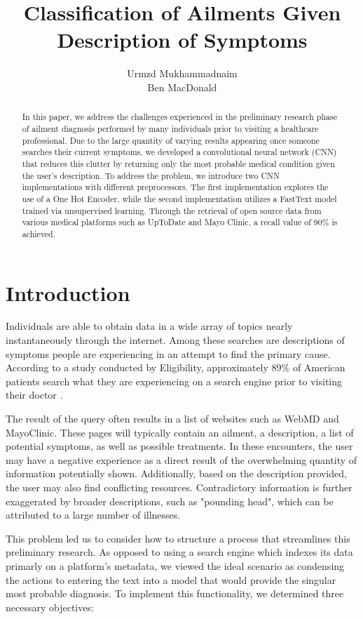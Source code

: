 \documentclass[12pt]{report}
\title{Classification of Ailments Given Description of Symptoms}
\author{Urmzd Mukhammadnaim \\ Ben MacDonald}
\begin{document}
\maketitle
\tableofcontents
\begin{abstract}
	In this paper, we address the challenges experienced in the preliminary research phase
	of ailment diagnosis performed by many individuals prior to visiting a
	healthcare professional. Due to the large quantity of varying results appearing
	once someone searches their current symptoms, we developed a convolutional
	neural network (CNN) that reduces this clutter by returning only the most
	probable medical condition given the user's description.
	To address the problem, we introduce two CNN implementations with different
	preprocessors. The first implementation explores the use of a One Hot Encoder,
	while the second implementation utilizes a FastText model trained via
	unsupervised learning. Through the retrieval of open source data from various medical platforms such
	as UpToDate and Mayo Clinic, a recall value of 90\% is achieved.
\end{abstract}

\chapter{Introduction}
Individuals are able to obtain data in a wide array of topics nearly
instantaneously through the internet. Among these searches are descriptions of
symptoms people are experiencing in an attempt to find the primary cause.
According to a study conducted by Eligibility, approximately 89\% of American
patients search what they are experiencing on a search engine prior to visiting
their doctor \cite{guarino_2019}.

The result of the query often results in a list of websites such as WebMD and
MayoClinic. These pages will typically contain an ailment, a description,
a list of potential symptoms, as well as possible treatments. In these
encounters, the user may have a negative experience as a direct result of
the overwhelming quantity of information potentially shown. Additionally,
based on the description provided, the user may also find conflicting resources.
Contradictory information is further exaggerated by broader descriptions,
such as "pounding head", which can be attributed to a large number of illnesses.

This problem led us to consider how to structure a process that streamlines this
preliminary research. As opposed to using a search engine which indexes its data primarly
on a platform's metadata, we viewed the ideal scenario as condensing the actions
to entering the text into a model that would provide the singular most probable
diagnosis. To implement this functionality, we determined three necessary
objectives:
\end{document}
